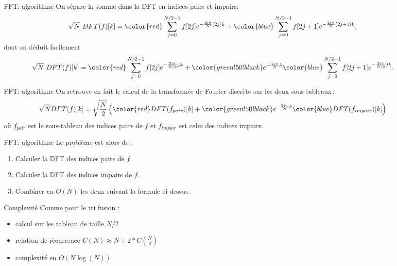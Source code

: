 \begin{frame}{FFT: algorithme}
On sépare la somme dans la DFT en indices {\color{red} pairs} et {\color{blue} impairs}:
\[\sqrt{N}~DFT(f)[k] =
{\color{red}\sum_{j=0}^{N/2-1}f[2j]e^{-\frac{2i\pi}{N} (2j)k}} +
{\color{blue} \sum_{j=0}^{N/2-1}f[2j+1]e^{-\frac{2i\pi}{N} (2j+1)k}},\]
dont on déduit facilement
\[\sqrt{N}~DFT(f)[k] =
{\color{red}\sum_{j=0}^{N/2-1}f[2j]e^{-\frac{2i\pi}{N/2} jk}} +
{\color{green!50!black} e^{-\frac{2i\pi}{N}k}}
{\color{blue} \sum_{j=0}^{N/2-1}f[2j+1]e^{-\frac{2i\pi}{N/2} jk}}.\]
\end{frame}

\begin{frame}{FFT: algorithme}
On retrouve en fait le calcul de la transformée de Fourier discrète sur les deux sous-tableaux\,:
\begin{equation}
\sqrt{N} DFT(f)[k] = \sqrt{\frac{N}{2}}
\left(
{\color{red} DFT(f_{pair})[k]} + {\color{green!50!black} e^{-\frac{2i\pi}{N}k}} {\color{blue} DFT(f_{impair})[k]}
\right)
\end{equation}
 où $f_{pair}$ est le sous-tableau des indices pairs de $f$ et
 $f_{impair}$ est celui des indices impairs.
\end{frame}

\begin{frame}{FFT: algorithme}
Le problème est alors de :
\begin{enumerate}
\item Calculer la DFT des indices pairs de $f$.
\item Calculer la DFT des indices impairs de $f$.
\item Combiner en $O(N)$ les deux suivant la formule ci-dessus.
\end{enumerate}
\end{frame}

\begin{frame}{Complexité}
Comme pour le tri fusion :
\begin{itemize}
\item calcul sur les tableau de taille $N/2$
\item relation de récurrence $C(N) \approx N + 2*C(\frac{N}{2})$
\item complexité en $O(N \log(N))$
\end{itemize}
\end{frame}

